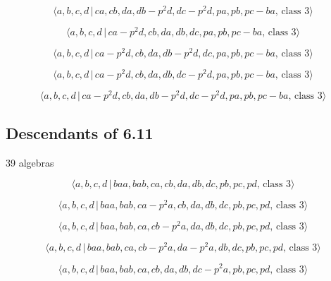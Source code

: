 \documentclass[10pt]{article}
\begin{document}
\begin{equation}
\langle a,b,c,d\,|\,ca,cb,da,db-p^2d,dc-p^2d,pa,pb,pc-ba,\,\text{class }%
3\rangle  \tag{7.3604}
\end{equation}

\begin{equation}
\langle a,b,c,d\,|\,ca-p^2d,cb,da,db,dc,pa,pb,pc-ba,\,\text{class }3\rangle 
\tag{7.3605}
\end{equation}

\begin{equation}
\langle a,b,c,d\,|\,ca-p^2d,cb,da,db-p^2d,dc,pa,pb,pc-ba,\,\text{class }%
3\rangle  \tag{7.3606}
\end{equation}

\begin{equation}
\langle a,b,c,d\,|\,ca-p^2d,cb,da,db,dc-p^2d,pa,pb,pc-ba,\,\text{class }%
3\rangle  \tag{7.3607}
\end{equation}

\begin{equation}
\langle a,b,c,d\,|\,ca-p^2d,cb,da,db-p^2d,dc-p^2d,pa,pb,pc-ba,\,\text{class }%
3\rangle  \tag{7.3608}
\end{equation}

\subsection{Descendants of 6.11}

39 algebras

\begin{equation}
\langle a,b,c,d\,|\,baa,bab,ca,cb,da,db,dc,pb,pc,pd,\,\text{class }3\rangle 
\tag{7.3609}
\end{equation}

\begin{equation}
\langle a,b,c,d\,|\,baa,bab,ca-p^2a,cb,da,db,dc,pb,pc,pd,\,\text{class }%
3\rangle  \tag{7.3610}
\end{equation}

\begin{equation}
\langle a,b,c,d\,|\,baa,bab,ca,cb-p^2a,da,db,dc,pb,pc,pd,\,\text{class }%
3\rangle  \tag{7.3611}
\end{equation}

\begin{equation}
\langle a,b,c,d\,|\,baa,bab,ca,cb-p^2a,da-p^2a,db,dc,pb,pc,pd,\,\text{class }%
3\rangle  \tag{7.3612}
\end{equation}

\begin{equation}
\langle a,b,c,d\,|\,baa,bab,ca,cb,da,db,dc-p^2a,pb,pc,pd,\,\text{class }%
3\rangle  \tag{7.3613}
\end{equation}
\end{document}

